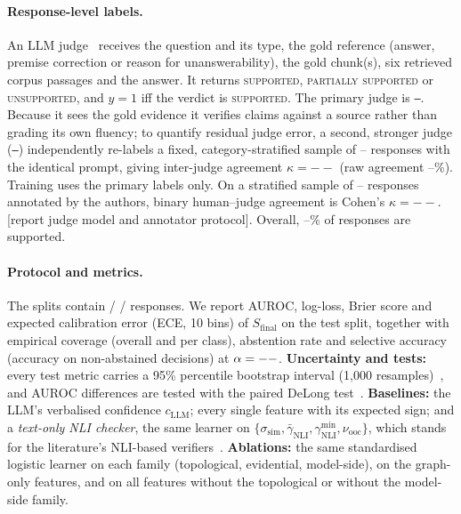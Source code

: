 \documentclass[10pt,twocolumn]{article}
\theoremstyle{remark}
\newcommand{\todo}[1]{\textcolor{red!70!black}{[#1]}}
\newcommand{\SupportedRate}{--}\newcommand{\Champion}{--}\newcommand{\TestAUC}{--}\newcommand{\TestLL}{--}
\newcommand{\JudgeKappa}{--}\newcommand{\JudgeN}{--}
\newcommand{\PrimaryJudge}{--}\newcommand{\CrossJudge}{--}\newcommand{\CrossJudgeN}{--}\newcommand{\CrossJudgeKappa}{--}\newcommand{\CrossJudgeAgree}{--}
\begin{document}
\paragraph{Response-level labels.}
An LLM judge~\cite{zheng2023judging} receives the question and its type, the gold reference (answer, premise
correction or reason for unanswerability), the gold chunk(s), six retrieved corpus passages and the answer. It
returns \textsc{supported}, \textsc{partially supported} or \textsc{unsupported}, and $y=1$ iff the verdict is
\textsc{supported}. The primary judge is \texttt{\PrimaryJudge}. Because it sees the gold evidence it verifies
claims against a source rather than grading its own fluency; to quantify residual judge error, a second, stronger judge
(\texttt{\CrossJudge}) independently re-labels a fixed, category-stratified sample of \CrossJudgeN{} responses with the
identical prompt, giving inter-judge agreement $\kappa=\CrossJudgeKappa$ (raw agreement \CrossJudgeAgree\%).
Training uses the primary labels only. On a stratified sample of \JudgeN{} responses annotated by the authors,
binary human--judge agreement is Cohen's $\kappa=\JudgeKappa$.
\todo{report judge model and annotator protocol}. Overall, \SupportedRate\% of responses are supported.

\paragraph{Protocol and metrics.}
The splits contain \NTrain{} / \NCal{} / \NTest{} responses. We report AUROC, log-loss, Brier score and expected
calibration error (ECE, 10 bins) of $S_{\mathrm{final}}$ on the test split, together with empirical coverage (overall
and per class), abstention rate and selective accuracy (accuracy on non-abstained decisions) at $\alpha=--$.
\textbf{Uncertainty and tests:} every test metric carries a 95\% percentile bootstrap interval
(1{,}000 resamples)~\cite{efron1993bootstrap}, and AUROC differences are tested with the paired DeLong
test~\cite{delong1988comparing,sun2014fast}. \textbf{Baselines:} the LLM's verbalised confidence $c_{\mathrm{LLM}}$;
every single feature with its expected sign; and a \emph{text-only NLI checker}, the same learner on
$\{\sigma_{\mathrm{sim}},\bar\gamma_{\mathrm{NLI}},\gamma^{\min}_{\mathrm{NLI}},\nu_{\mathrm{ooc}}\}$, which stands for the
literature's NLI-based verifiers~\cite{laban2022summac,min2023factscore}. \textbf{Ablations:} the same standardised
logistic learner on each family (topological, evidential, model-side), on the graph-only features, and on all
features without the topological or without the model-side family.
\end{document}
